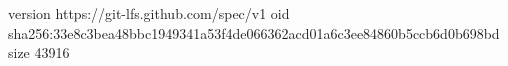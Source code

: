 version https://git-lfs.github.com/spec/v1
oid sha256:33e8c3bea48bbc1949341a53f4de066362acd01a6c3ee84860b5ccb6d0b698bd
size 43916
